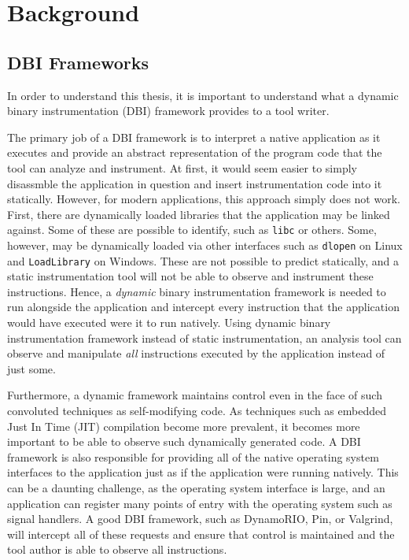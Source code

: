 \chapter{Background}
\label{sec:background}


\section{DBI Frameworks}

In order to understand this thesis, it is important to understand what a dynamic
binary instrumentation (DBI) framework provides to a tool writer.

The primary job of a DBI framework is to interpret a native application as it
executes and provide an abstract representation of the program code that the
tool can analyze and instrument.  At first, it would seem easier to simply
disassmble the application in question and insert instrumentation code into it
statically.  However, for modern applications, this approach simply does not
work.  First, there are dynamically loaded libraries that the application may
be linked against.  Some of these are possible to identify, such as {\tt libc}
or others.  Some, however, may be dynamically loaded via other interfaces such
as {\tt dlopen} on Linux and {\tt LoadLibrary} on Windows.  These are not
possible to predict statically, and a static instrumentation tool will not be
able to observe and instrument these instructions.  Hence, a {\em dynamic}
binary instrumentation framework is needed to run alongside the application and
intercept every instruction that the application would have executed were it to
run natively.  Using dynamic binary instrumentation framework instead of static
instrumentation, an analysis tool can observe and manipulate {\em all}
instructions executed by the application instead of just some.

Furthermore, a dynamic framework maintains control even in the face of such
convoluted techniques as self-modifying code.  As techniques such as embedded
Just In Time (JIT) compilation become more prevalent, it becomes more important
to be able to observe such dynamically generated code.  A DBI framework is also
responsible for providing all of the native operating system interfaces to the
application just as if the application were running natively.  This can be a
daunting challenge, as the operating system interface is large, and an
application can register many points of entry with the operating system such as
signal handlers.  A good DBI framework, such as DynamoRIO, Pin, or Valgrind,
will intercept all of these requests and ensure that control is maintained and
the tool author is able to observe all instructions.

